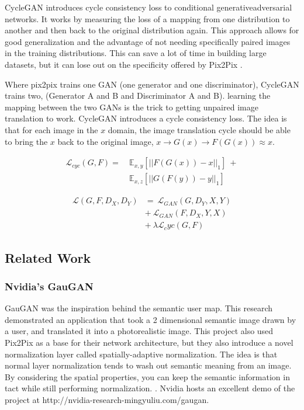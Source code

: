 \documentclass[twocolumn]{article}
\begin{document}
	CycleGAN introduces cycle consistency loss to conditional generativeadversarial networks. It works by measuring the loss of a mapping from one distribution to another and then back to the original distribution again. This approach allows for good generalization and the advantage of not needing specifically paired images in the training distributions. This can save a lot of time in building large datasets, but it can lose out on the specificity offered by Pix2Pix \cite{zhu2017unpaired}.
	
	Where pix2pix trains one GAN (one generator and one discriminator), CycleGAN trains two, (Generator A and B and Discriminator A and B). learning the mapping between the two GANs is the trick to getting unpaired image translation to work. CycleGAN introduces a cycle consistency loss. The idea is that for each image in the $x$ domain, the image translation cycle should be able to bring the $x$ back to the original image, $x \rightarrow G(x) \rightarrow F(G(x)) \approx x$.
	
	\begin{align*}
		\mathcal{L}_{cyc}(G, F) =\ & \mathbb{E}_{x,y}[||F(G(x)) - x||_1]\ + \\
		& \mathbb{E}_{x,z}[||G(F(y)) - y||_1]
	\end{align*}
	
	\begin{align*}
		\mathcal{L}(G, F, D_X, D_Y) &=\ \mathcal{L}_{GAN}(G, D_Y, X, Y) \\
		&+\ \mathcal{L}_{GAN}(F, D_X, Y, X) \\
		&+\ \lambda \mathcal{L}_cyc (G, F)  
	\end{align*}
	

	\subsection{Related Work}
	
	\subsubsection{Nvidia's GauGAN}
	
	GauGAN was the inspiration behind the semantic user map. This research demonstrated an application that took a 2 dimensional semantic image drawn by a user, and translated it into a photorealistic image. This project also used Pix2Pix as a base for their network architecture, but they also introduce a novel normalization layer called spatially-adaptive normalization. The idea is that normal layer normalization tends to wash out semantic meaning from an image. By considering the spatial properties, you can keep the semantic information in tact while still performing normalization. \cite{park2019semantic}	. Nvidia hosts an excellent demo of the project at http://nvidia-research-mingyuliu.com/gaugan.
	
\end{document}
